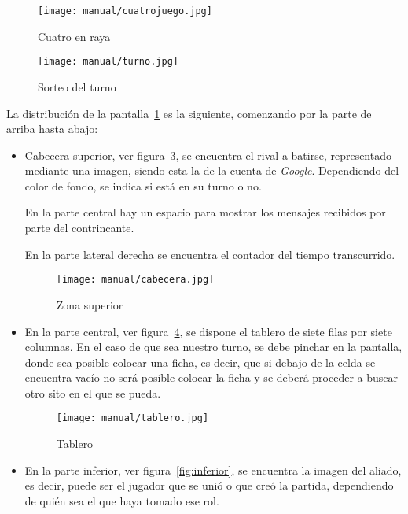 \begin{figure}[H]
	\centering
	\texttt{[image: manual/cuatrojuego.jpg]}
	\caption{Cuatro en raya}\label{fig:cuatrojuego}
\end{figure}

\begin{figure}[H]
	\centering
	\texttt{[image: manual/turno.jpg]}
	\caption{Sorteo del turno}\label{fig:sorteo}
\end{figure}

La distribución de la pantalla~\ref{fig:cuatrojuego} es la siguiente, comenzando por la parte de arriba hasta abajo:

\begin{itemize}
	\item Cabecera superior, ver figura~\ref{fig:cabecera}, se encuentra el rival a batirse, representado mediante una imagen, siendo esta la de la cuenta de \emph{Google}. Dependiendo del color de fondo, se indica si está en su turno o no.
	
	En la parte central hay un espacio para mostrar los mensajes recibidos por parte del contrincante.
	
	En la parte lateral derecha se encuentra el contador del tiempo transcurrido.
	
	 \begin{figure}[H]
	 	\centering
	 	\texttt{[image: manual/cabecera.jpg]}
	 	\caption{Zona superior}\label{fig:cabecera}
	 \end{figure}
 
	\item En la parte central, ver figura~\ref{fig:tablero}, se dispone el tablero de siete filas por siete columnas. En el caso de que sea nuestro turno, se debe pinchar en la pantalla, donde sea posible colocar una ficha, es decir, que si debajo de la celda se encuentra vacío no será posible colocar la ficha y se deberá proceder a buscar otro sito en el que se pueda.
	
	\begin{figure}[H]
		\centering
		\texttt{[image: manual/tablero.jpg]}
		\caption{Tablero}\label{fig:tablero}
	\end{figure}

	\item En la parte inferior, ver figura~\ref{fig:inferior}, se encuentra la imagen del aliado, es decir, puede ser el jugador que se unió o que creó la partida, dependiendo de quién sea el que haya tomado ese rol.
	

\end{itemize}
